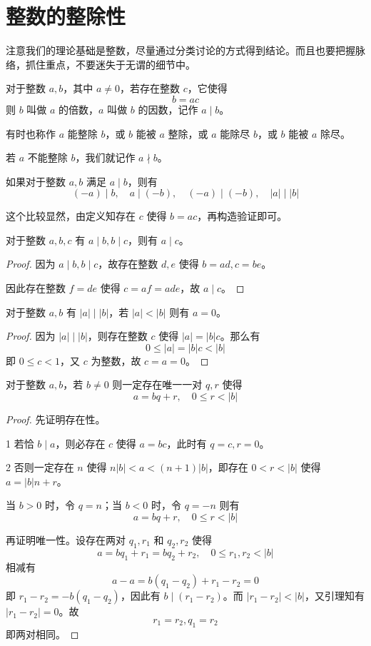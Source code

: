 \chapter{整数的整除性}

注意我们的理论基础是整数，尽量通过分类讨论的方式得到结论。而且也要把握脉络，抓住重点，不要迷失于无谓的细节中。

\begin{definition}
	对于整数 $a,b$，其中 $a\ne 0$，若存在整数 $c$，它使得
	$$b=ac$$
	则 $b$ 叫做 $a$ 的倍数，$a$ 叫做 $b$ 的因数，记作 $a \mid b$。
\end{definition}

有时也称作 $a$ 能整除 $b$，或 $b$ 能被 $a$ 整除，或 $a$ 能除尽 $b$，或 $b$ 能被 $a$ 除尽。

若 $a$ 不能整除 $b$，我们就记作 $a \nmid b$。

\begin{lemma}
	如果对于整数 $a,b$ 满足 $a \mid b$，则有
	$$(-a) \mid b,\quad a \mid (-b),\quad (-a) \mid (-b),\quad |a| \mid |b|$$
\end{lemma}

这个比较显然，由定义知存在 $c$ 使得 $b=ac$，再构造验证即可。

\begin{lemma}
	对于整数 $a,b,c$ 有 $a \mid b,b \mid c$，则有 $a \mid c$。
\end{lemma}

\begin{proof}
	因为 $a \mid b,b \mid c$，故存在整数 $d,e$ 使得 $b=ad,c=be$。

	因此存在整数 $f=de$ 使得 $c=af=ade$，故 $a \mid c$。
\end{proof}

\begin{lemma}
	对于整数 $a,b$ 有 $|a| \mid |b|$，若 $|a|<|b|$ 则有 $a=0$。
\end{lemma}

\begin{proof}
	因为 $|a| \mid |b|$，则存在整数 $c$ 使得 $|a|=|b|c$。那么有
	$$0 \leqslant |a|=|b|c<|b|$$
	即 $0\leqslant c<1$，又 $c$ 为整数，故 $c=a=0$。
\end{proof}

\begin{theorem}
	对于整数 $a,b$，若 $b\ne 0$ 则一定存在唯一一对 $q,r$ 使得
	$$a=bq+r,\quad 0 \leqslant r< |b|$$
\end{theorem}

\begin{proof}
	先证明存在性。
	
	\num{1} 若恰 $b \mid a$，则必存在 $c$ 使得 $a=bc$，此时有 $q=c,r=0$。

	\num{2} 否则一定存在 $n$ 使得 $n|b|<a<(n+1)|b|$，即存在 $0<r<|b|$ 使得 $a=|b|n+r$。
	
	当 $b>0$ 时，令 $q=n$；当 $b<0$ 时，令 $q=-n$ 则有
	$$a=bq+r,\quad 0 \leqslant r< |b|$$

	再证明唯一性。设存在两对 $q_1,r_1$ 和 $q_2,r_2$ 使得
	$$a=bq_1+r_1=bq_2+r_2,\quad 0 \leqslant r_1,r_2< |b|$$
	相减有
	$$a-a=b(q_1-q_2)+r_1-r_2=0$$
	即 $r_1-r_2=-b(q_1-q_2)$，因此有 $b \mid (r_1-r_2)$。而 $|r_1-r_2|<|b|$，又引理知有 $|r_1-r_2|=0$。故
	$$r_1=r_2,q_1=r_2$$
	即两对相同。
\end{proof}

